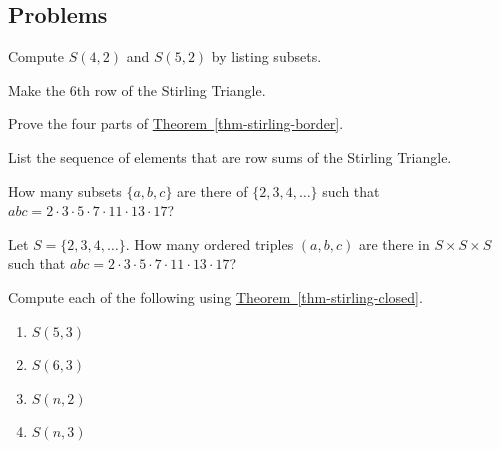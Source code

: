 \documentclass[10pt,]{book}
\theoremstyle{plain}
\theoremstyle{definition}
\theoremstyle{definition}
\theoremstyle{definition}
\theoremstyle{definition}
\numberwithin{equation}{chapter}
\begin{document}
\subsection*{Problems}\label{exercises-9}
\begin{divisionexercise}{1}\hypertarget{exercise-100}{}
\hypertarget{p-1089}{}%
Compute \(S(4,2)\) and \(S(5,2)\) by listing subsets.%
\end{divisionexercise}%
\begin{divisionexercise}{2}\hypertarget{exercise-101}{}
\hypertarget{p-1090}{}%
Make the 6th row of the Stirling Triangle.%
\end{divisionexercise}%
\begin{divisionexercise}{3}\hypertarget{exercise-102}{}
\hypertarget{p-1091}{}%
Prove the four parts of \hyperref[thm-stirling-border]{Theorem~\ref{thm-stirling-border}}.%
\end{divisionexercise}%
\begin{divisionexercise}{4}\hypertarget{exercise-103}{}
\hypertarget{p-1092}{}%
List the sequence of elements that are row sums of the Stirling Triangle.%
\end{divisionexercise}%
\begin{divisionexercise}{5}\hypertarget{exercise-104}{}
\hypertarget{p-1093}{}%
How many subsets \(\{a,b,c\}\) are there of \(\{2,3,4,\ldots\}\) such that \(abc = 2 \cdot 3 \cdot 5 \cdot 7 \cdot 11 \cdot 13 \cdot 17\)?%
\end{divisionexercise}%
\begin{divisionexercise}{6}\hypertarget{exercise-105}{}
\hypertarget{p-1094}{}%
Let \(S = \{2,3,4,\ldots\}\).  How many ordered triples \((a,b,c)\) are there in \(S\times S \times S\) such that \(abc = 2 \cdot 3 \cdot 5 \cdot 7 \cdot 11 \cdot 13 \cdot 17\)?%
\end{divisionexercise}%
\begin{divisionexercise}{7}\hypertarget{exercise-106}{}
\hypertarget{p-1095}{}%
Compute each of the following using \hyperref[thm-stirling-closed]{Theorem~\ref{thm-stirling-closed}}. \leavevmode%
\begin{enumerate}[label=(\alph*)]
\item\hypertarget{li-219}{}\(S(5,3)\)%
\item\hypertarget{li-220}{}\(S(6,3)\)%
\item\hypertarget{li-221}{}\(S(n,2)\)%
\item\hypertarget{li-222}{}\(S(n,3)\)%
\end{enumerate}
%
\end{divisionexercise}%
\end{document}
